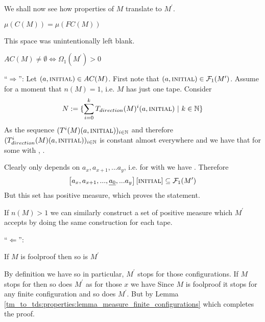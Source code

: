 We shall now see how properties of $M$ translate to $M^\prime$.

\begin{Lemma}
	\label{tm_to_tds:properties:lemma_measure_finite_configurations}
	$\mu(C(M)) = \mu(FC(M))$
\end{Lemma}
\proof
	This space was unintentionally left blank.
\endproof

\begin{Lemma}
	\label{tm_to_tds:properties:lemma_fundamental_value}
	$AC(M) \neq \emptyset \Leftrightarrow \Omega_1(M^\prime) > 0$
\end{Lemma}
\proof
	``$\Rightarrow$'':
	Let $(a,\text{\scshape{initial}}) \in AC(M)$.
	First note that $(a,\text{\scshape{initial}}) \in \mathcal{F}_1(M^\prime)$.
	Assume for a moment that $n(M) = 1$, i.e. $M$ has just one tape. Consider
	\begin{align*}
		N := \{ \sum_{i=0}^k T_{direction}(M)^i(a,\text{\scshape{initial}})~|~k \in \mathbb{N} \}
	\end{align*}
	As the sequence $(T^i(M)(a,\text{\scshape{initial}}))_{i \in \mathbb{N}}$ and therefore $(T_{direction}^i(M)(a,\text{\scshape{initial}}))_{i \in \mathbb{N}}$ is constant almost everywhere
	and 
	we have that  for some  with , .
	
	Clearly  only depends on $a_x, a_{x+1},...a_y$, i.e. for  with  we have . Therefore
	\begin{align*}
		\left [ a_x, a_{x+1},...,\underline{a_0},...a_y \right ] \left [\text{\scshape{initial}} \right ] \subseteq \mathcal{F}_1(M^\prime)
	\end{align*}
	But this set has positive measure, which proves the statement.

	If $n(M) > 1$ we can similarly construct a set of positive measure which $M^\prime$ accepts by doing the same construction for each tape.

	``$\Leftarrow$'':
\endproof

\begin{Lemma}
	\label{tm_to_tds:properties:lemma_foolproof}
	If $M$ is foolproof then so is $M^\prime$
\end{Lemma}
\proof
	By definition we have  so in particular, $M^\prime$ stops for those configurations.
	If $M$ stops for  then so does $M^\prime$ as for those $x$ we have 
	Since $M$ is foolproof it stops for any finite configuration and so does $M^\prime$. But  by Lemma \ref{tm_to_tds:properties:lemma_measure_finite_configurations} which completes the proof.
\endproof

